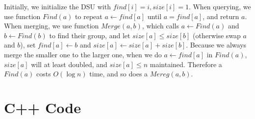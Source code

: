 \documentclass{article}
\begin{document}
Initially, we initialize the DSU with $find[i]=i, size[i]=1$. When querying, we use function $Find(a)$ to repeat $a\leftarrow find[a]$ until $a=find[a]$, and return $a$. When merging, we use function $Merge(a,b)$, which calls $a\leftarrow Find(a)$ and $b\leftarrow Find(b)$ to find their group, and let $size[a]\le size[b]$ (otherwise swap $a$ and $b$), set $find[a]\leftarrow b$ and $size[a]\leftarrow size[a]+size[b]$. Because we always merge the smaller one to the larger one, when we do $a\leftarrow find[a]$ in $Find(a)$, $size[a]$ will at least doubled, and $size[a]\le n$ maintained. Therefore a $Find(a)$ costs $O(\log n)$ time, and so does a $Mereg(a,b)$.

\section{C++ Code}
\lstset{breaklines}
\lstset{extendedchars=false}
\end{document}
